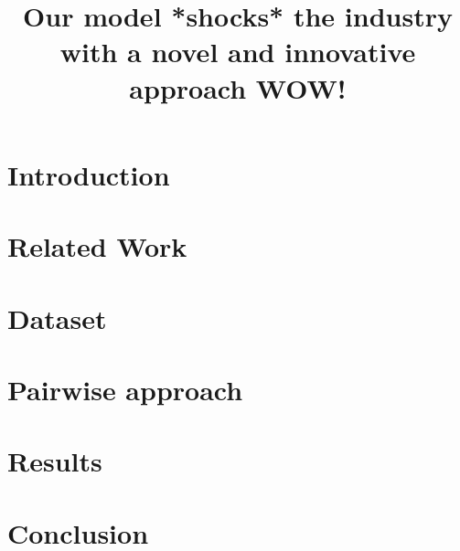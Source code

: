 \documentclass[10pt, a4paper]{article}
\title{{\color{red} Our model *shocks* the industry with a novel and innovative approach WOW!}}
\begin{document}
\maketitleabstract

\section{Introduction} \label{intro}


\section{Related Work}
 \label{related-work}

\section{Dataset} \label{dataset}


\section{Pairwise approach} \label{approach}


\section{Results} \label{results}


\section{Conclusion}
 \label{conclusion}


 
\end{document}
